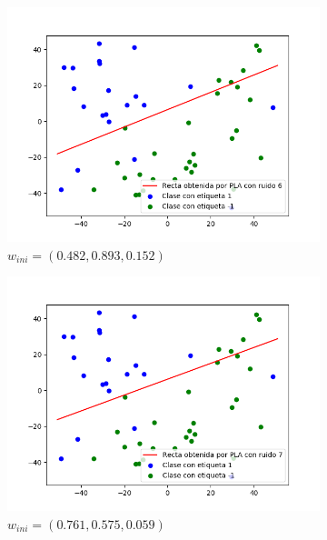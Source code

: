 \documentclass[12pt,a4paper]{article}
\begin{document}
\begin{figure}[H]
	\centering
	\begin{subfigure}{0.32\textwidth}
		\includegraphics[scale=0.37]{./Imagenes/ej2-19.png}
		\caption{$w_{ini} = (0.482,0.893,0.152)$}
	\end{subfigure}
	\begin{subfigure}{0.33\textwidth}
		\includegraphics[scale=0.37]{./Imagenes/ej2-20.png}
		\caption{$w_{ini} = (0.761,0.575,0.059)$}
	\end{subfigure}
	\begin{subfigure}{0.33\textwidth}

\end{subfigure}
\end{figure}
\end{document}
